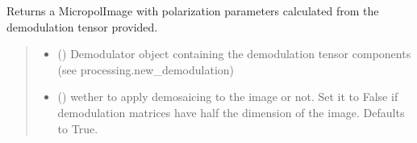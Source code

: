 \documentclass[letterpaper,10pt,english]{sphinxmanual}
\begin{document}
\begin{fulllineitems}
\begin{fulllineitems}
\begin{quote}
\begin{description}
\sphinxAtStartPar
{\hyperref[\detokenize{micropolarray:micropolarray.micropol_image.MicropolImage}]{}}

\end{description}\end{quote}

\end{fulllineitems}


\begin{fulllineitems}
\label{\detokenize{micropolarray:micropolarray.micropol_image.MicropolImage.demodulate}}
\pysigstartsignatures
{}
\pysigstopsignatures
\sphinxAtStartPar
Returns a MicropolImage with polarization parameters calculated from the demodulation tensor provided.
\begin{quote}\begin{description}
\begin{itemize}
\item {} 
\sphinxAtStartPar
{} ({\hyperref[\detokenize{micropolarray.processing:micropolarray.processing.demodulation.Demodulator}]{}}) \textendash{} Demodulator object containing the demodulation tensor components (see processing.new\_demodulation)

\item {} 
\sphinxAtStartPar
{} (\sphinxstyleliteralemphasis{\sphinxupquote{, }}) \textendash{} wether to apply demosaicing to the image or not. Set it to False if demodulation matrices have half the dimension of the image. Defaults to True.


\end{itemize}
\end{description}
\end{quote}
\end{fulllineitems}
\end{fulllineitems}
\end{document}
